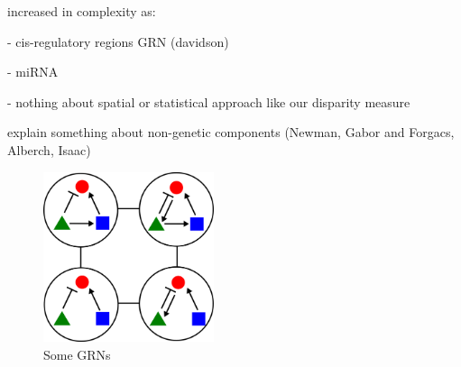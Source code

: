 increased in complexity as:

- cis-regulatory regions GRN (davidson)

- miRNA

- nothing about spatial or statistical approach like our disparity measure


explain something about non-genetic components (Newman, Gabor and Forgacs, Alberch, Isaac)



\begin{figure}[h]
  \includegraphics[width=5cm]{./Images/GRNs.png}
  \centering
  \caption{
  Some GRNs
 }
  \label{fig:GRNs}
\end{figure}
